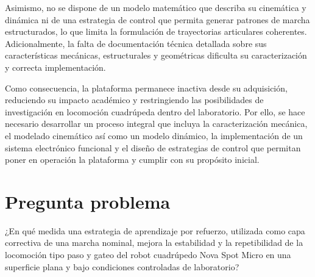 Asimismo, no se dispone de un modelo matemático que describa su cinemática y dinámica ni de una estrategia de control que permita generar patrones de marcha estructurados, lo que limita la formulación de trayectorias articulares coherentes. Adicionalmente, la falta de documentación técnica detallada sobre sus características mecánicas, estructurales y geométricas dificulta su caracterización y correcta implementación.

Como consecuencia, la plataforma permanece inactiva desde su adquisición, reduciendo su impacto académico y restringiendo las posibilidades de investigación en locomoción cuadrúpeda dentro del laboratorio. Por ello, se hace necesario desarrollar un proceso integral que incluya la caracterización mecánica, el modelado cinemático así como un modelo dinámico, la implementación de un sistema electrónico funcional y el diseño de estrategias de control que permitan poner en operación la plataforma y cumplir con su propósito inicial.

\section{Pregunta problema}

¿En qué medida una estrategia de aprendizaje por refuerzo, utilizada como capa
correctiva de una marcha nominal, mejora la estabilidad y la repetibilidad de
la locomoción tipo paso y gateo del robot cuadrúpedo Nova Spot Micro en una
superficie plana y bajo condiciones controladas de laboratorio?
